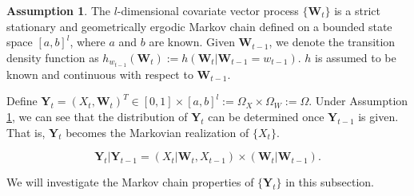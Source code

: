 \documentclass{article}
\theoremstyle{definition}
\newtheorem{assumption}{Assumption}
\begin{document}
\begin{assumption}
\label{assumption: properties of W_t}
The $l$-dimensional covariate vector process $\{\bm{W}_t\}$ is a strict stationary and geometrically ergodic Markov chain defined on a bounded state space $[a,b]^l$, where $a$ and $b$ are known. Given $\bm{W}_{t-1}$, we denote the transition density function as $h_{w_{t-1}}(\bm{W}_{t}):=h(\bm{W}_{t}|\bm{W}_{t-1} = w_{t-1}).$ $h$ is assumed to be known and continuous with respect to $\bm{W}_{t-1}.$ 
\end{assumption}
Define $\bm{Y}_{t} = (X_t,\bm{W}_t)^T \in [0,1] \times [a,b]^l:= \Omega_X \times \Omega_W:= \Omega$. Under Assumption \ref{assumption: properties of W_t}, we can see that the distribution of $\bm{Y}_t$ can be determined once $\bm{Y}_{t-1}$ is given. That is, $\bm{Y}_t$ becomes the Markovian realization of $\{X_t\}$. 

\begin{equation*}
    \bm{Y}_t | \bm{Y}_{t-1} = (X_t|\bm{W}_t, X_{t-1}) \times (\bm{W}_t|\bm{W}_{t-1}).
\end{equation*}

We will investigate the Markov chain properties of $\{\bm{Y}_{t}\}$ in this subsection. 
\end{document}
